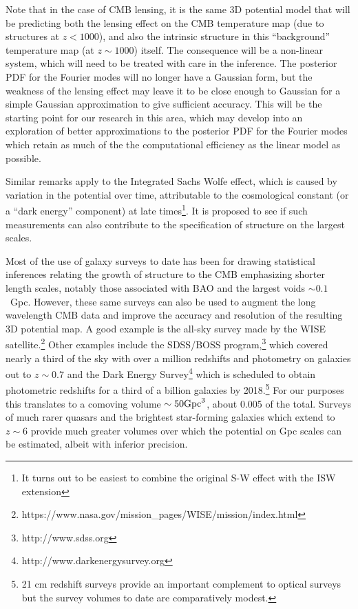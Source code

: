 \documentclass[psfig,12pt]{article}
\def\ni{\noindent}
\begin{document}
{Note that in the case of CMB lensing, it is the same 3D potential model
that will be predicting both the lensing effect on the CMB temperature
map (due to structures at $z < 1000$), and  also the intrinsic structure
in this ``background'' temperature map (at $z \sim 1000$) itself. The
consequence will be a non-linear system, which will need to be treated
with care in the inference. The posterior PDF for the Fourier modes will
no longer have a Gaussian form, but the weakness of the lensing effect
may leave it to be close enough to Gaussian for a simple Gaussian
approximation to give sufficient accuracy. This will be the starting
point for our research in this area, which may develop into an
exploration  of better approximations to the posterior PDF for the
Fourier modes  which retain as much of the the computational efficiency
as the linear model as possible.

Similar remarks apply to the Integrated Sachs Wolfe effect, which is
caused by variation in the potential over time, attributable to the
cosmological constant (or a ``dark energy'' component) at late times\footnote{It turns out to be easiest to combine the original S-W effect with the ISW extension}.
It is proposed to see if such
measurements can also contribute to the specification of structure on
the largest scales.

\ni{\bf Galaxy Surveys and the ``Local'' Universe:}
Most of the use of galaxy surveys to date has been for drawing statistical inferences
relating the growth of structure to the CMB emphasizing shorter length
scales, notably those associated with BAO and the largest voids
$\sim0.1$~Gpc. However, these same surveys can also be used to augment
the long wavelength CMB data and improve the accuracy and resolution of
the resulting 3D potential map. A good example is the
all-sky survey made by the WISE satellite.\footnote{https://www.nasa.gov/mission\_pages/WISE/mission/index.html}
Other examples include the SDSS/BOSS
program,\footnote{http://www.sdss.org} which covered nearly a third of
the sky with over a million redshifts and photometry on galaxies out to
$z\sim0.7$ and the Dark Energy Survey\footnote{http://www.darkenergysurvey.org} which is scheduled to obtain photometric redshifts for a third of a billion galaxies by 2018.\footnote{21 cm redshift surveys provide an important
complement to optical surveys but the survey volumes to date are
comparatively modest.} For our purposes this translates to a comoving
volume $\sim50{\rm Gpc}^3$, about 0.005 of the total. Surveys of much
rarer quasars and the brightest star-forming galaxies which extend to
$z\sim6$ provide much greater volumes over which the potential on Gpc
scales can be estimated, albeit with inferior precision.

}
\end{document}
